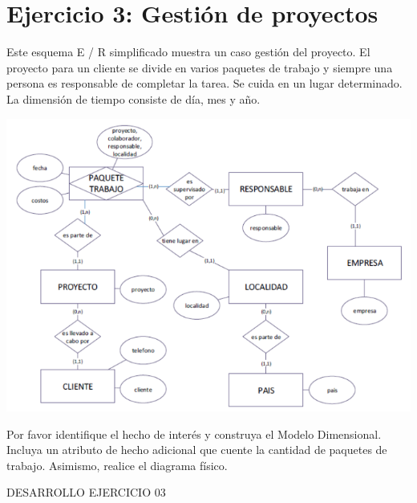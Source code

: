 \section{Ejercicio 3: Gestión de proyectos  } 

Este esquema E / R simplificado muestra un caso gestión del proyecto.
El proyecto para un cliente se divide en varios paquetes de trabajo y siempre una persona es responsable de completar la
tarea. Se cuida en un lugar determinado.
La dimensión de tiempo consiste de día, mes y año.


	\begin{center}
	\includegraphics[width=17cm]{./Imagenes/3}
	\end{center}	

Por favor identifique el hecho de interés y construya el Modelo Dimensional. Incluya un atributo de hecho adicional que
cuente la cantidad de paquetes de trabajo. Asimismo, realice el diagrama físico.

DESARROLLO 
EJERCICIO 03


